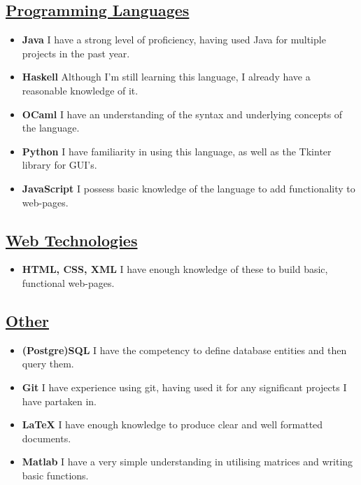 \documentclass[11pt]{article}
\begin{document}
		\subsection*{\underline{Programming Languages}}
		\begin{itemize}
			\item \textbf{Java} I have a strong level of proficiency, having used Java for multiple projects in the past year.
			\item \textbf{Haskell} Although I'm still learning this language, I already have a reasonable knowledge of it.
			\item \textbf{OCaml} I have an understanding of the syntax and underlying concepts of the language.
			\item \textbf{Python} I have familiarity in using this language, as well as the Tkinter library for GUI's. 
			\item \textbf{JavaScript} I possess basic knowledge of the language to add functionality to web-pages.
		\end{itemize} 
		\subsection*{\underline{Web Technologies}}
		\begin{itemize}
			\item \textbf{HTML, CSS, XML} I have enough knowledge of these to build basic, functional web-pages.
		\end{itemize}
		\subsection*{\underline{Other}}
		\begin{itemize}
			\item \textbf{(Postgre)SQL} I have the competency to define database entities and then query them.
			\item \textbf{Git} I have experience using git, having used it for any significant projects I have partaken in.
			\item \textbf{LaTeX} I have enough knowledge to produce clear and well formatted documents.
			\item \textbf{Matlab} I have a very simple understanding in utilising matrices and writing basic functions.
		\end{itemize}
\end{document}
